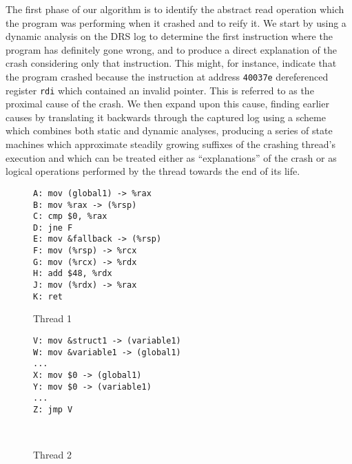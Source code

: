 \documentclass[10pt,twocolumn,preprint,natbib,authoryear]{sigplanconf}
\makeatletter
\newenvironment{subfloat}%
    {\def\caption##1{\gdef\subcapsave{\relax##1}}%
     \let\subcapsave=\@empty %
     \let\sf@oldlabel=\label
     \def\label##1{\xdef\sublabsave{\noexpand\label{##1}}}%
     \let\sublabsave\relax    %
     \setbox\subfigbox\hbox
       \bgroup}%
      {\egroup                %
     \let\label=\sf@oldlabel
     \subfigure[\subcapsave]{\box\subfigbox}}%
\makeatother
\begin{document}
The first phase of our algorithm is to identify the abstract read
operation which the program was performing when it crashed and to
reify it.  We start by using a dynamic analysis on the DRS log to
determine the first instruction where the program has definitely gone
wrong, and to produce a direct explanation of the crash considering
only that instruction.  This might, for instance, indicate that the
program crashed because the instruction at address \verb|40037e|
dereferenced register \verb|rdi| which contained an invalid pointer.
This is referred to as the proximal cause of the crash.  We then
expand upon this cause, finding earlier causes by translating it
backwards through the captured log using a scheme which combines both
static and dynamic analyses, producing a series of state machines
which approximate steadily growing suffixes of the crashing thread's
execution and which can be treated either as ``explanations'' of the
crash or as logical operations performed by the thread towards the end
of its life.

\begin{figure*}
 \begin{subfloat}
  \begin{minipage}{90mm}
\begin{verbatim}
A: mov (global1) -> %rax
B: mov %rax -> (%rsp)
C: cmp $0, %rax
D: jne F
E: mov &fallback -> (%rsp)
F: mov (%rsp) -> %rcx
G: mov (%rcx) -> %rdx
H: add $48, %rdx
J: mov (%rdx) -> %rax
K: ret
\end{verbatim}
  \end{minipage}
  \caption{Thread 1}
 \end{subfloat}
 \begin{subfloat}
  \begin{minipage}{90mm}
\begin{verbatim}
V: mov &struct1 -> (variable1)
W: mov &variable1 -> (global1)
...
X: mov $0 -> (global1)
Y: mov $0 -> (variable1)
...
Z: jmp V



\end{verbatim}
  \end{minipage}
  \caption{Thread 2}
 \end{subfloat}
 \caption{A buggy example of the privatize synchronization pattern.}
 \label{fig:broken_privatize}
\end{figure*}
\end{document}
